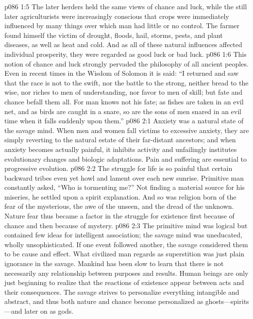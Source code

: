 \vs p086 1:5 The later herders held the same views of chance and luck, while the still later agriculturists were increasingly conscious that crops were immediately influenced by many things over which man had little or no control. The farmer found himself the victim of drought, floods, hail, storms, pests, and plant diseases, as well as heat and cold. And as all of these natural influences affected individual prosperity, they were regarded as good luck or bad luck.
\vs p086 1:6 This notion of chance and luck strongly pervaded the philosophy of all ancient peoples. Even in recent times in the Wisdom of Solomon it is said: “I returned and saw that the race is not to the swift, nor the battle to the strong, neither bread to the wise, nor riches to men of understanding, nor favor to men of skill; but fate and chance befall them all. For man knows not his fate; as fishes are taken in an evil net, and as birds are caught in a snare, so are the sons of men snared in an evil time when it falls suddenly upon them.”\plusone
{}%
\vs p086 2:1 Anxiety was a natural state of the savage mind. When men and women fall victims to excessive anxiety, they are simply reverting to the natural estate of their far\hyp{}distant ancestors; and when anxiety becomes actually painful, it inhibits activity and unfailingly institutes evolutionary changes and biologic adaptations. Pain and suffering are essential to progressive evolution.
\vs p086 2:2 The struggle for life is so painful that certain backward tribes even yet howl and lament over each new sunrise. Primitive man constantly asked, “Who is tormenting me?” Not finding a material source for his miseries, he settled upon a spirit explanation. And so was religion born of the fear of the mysterious, the awe of the unseen, and the dread of the unknown. Nature fear thus became a factor in the struggle for existence first because of chance and then because of mystery.
\pc \vs p086 2:3 The primitive mind was logical but contained few ideas for intelligent association; the savage mind was uneducated, wholly unsophisticated. If one event followed another, the savage considered them to be cause and effect. What civilized man regards as superstition was just plain ignorance in the savage. Mankind has been slow to learn that there is not necessarily any relationship between purposes and results. Human beings are only just beginning to realize that the reactions of existence appear between acts and their consequences. The savage strives to personalize everything intangible and abstract, and thus both nature and chance become personalized as ghosts---spirits---and later on as gods.
